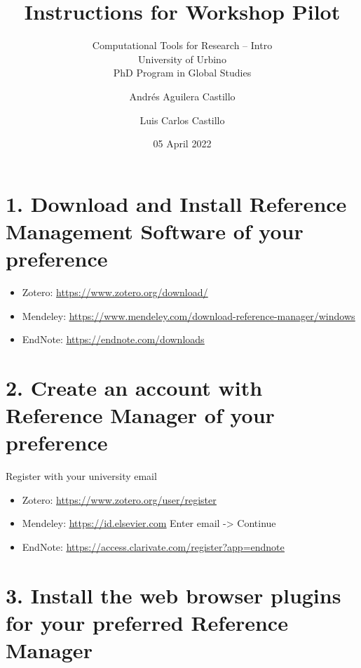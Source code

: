 \documentclass[
]{article}
\title{Instructions for Workshop Pilot}
\subtitle{Computational Tools for Research -- Intro\\
University of Urbino\\
PhD Program in Global Studies}
\author{Andrés Aguilera Castillo \and Luis Carlos Castillo}
\date{05 April 2022}
\begin{document}
\maketitle

\hypertarget{download-and-install-reference-management-software-of-your-preference}{%
\section{1. Download and Install Reference Management Software of your
preference}\label{download-and-install-reference-management-software-of-your-preference}}

\begin{itemize}
\item
  Zotero:
  \href{https://www.zotero.org/download/}{\uline{https://www.zotero.org/download/}}
\item
  Mendeley:
  \href{https://www.mendeley.com/download-reference-manager/windows}{\uline{https://www.mendeley.com/download-reference-manager/windows}}
\item
  EndNote:
  \href{https://endnote.com/downloads}{\uline{https://endnote.com/downloads}}
\end{itemize}

\hypertarget{create-an-account-with-reference-manager-of-your-preference}{%
\section{2. Create an account with Reference Manager of your
preference}\label{create-an-account-with-reference-manager-of-your-preference}}

Register with your university email

\begin{itemize}
\item
  Zotero:
  \href{https://www.zotero.org/user/register}{\uline{https://www.zotero.org/user/register}}
\item
  Mendeley:
  \href{https://id.elsevier.com}{\uline{https://id.elsevier.com}} Enter
  email -\textgreater{} Continue
\item
  EndNote:
  \href{https://access.clarivate.com/register?app=endnote}{\uline{https://access.clarivate.com/register?app=endnote}}
\end{itemize}

\hypertarget{install-the-web-browser-plugins-for-your-preferred-reference-manager}{%
\section{3. Install the web browser plugins for your preferred Reference
Manager}\label{install-the-web-browser-plugins-for-your-preferred-reference-manager}}
\end{document}
